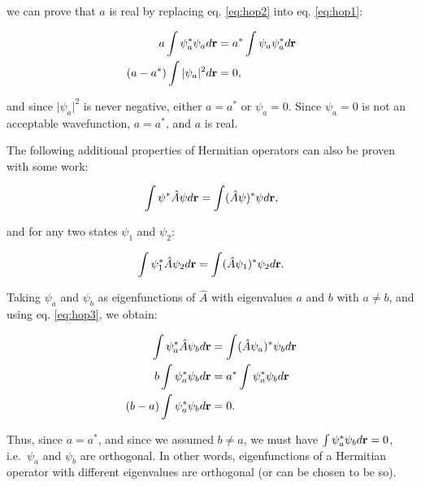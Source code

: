 \documentclass[
  9pt,
]{extbook}
\theoremstyle{definition}
\theoremstyle{definition}
\theoremstyle{definition}
\theoremstyle{remark}
\begin{document}
we can prove that \(a\) is real by replacing eq. \eqref{eq:hop2} into eq. \eqref{eq:hop1}:

\begin{equation}
\begin{aligned}
a \int \psi_a^{*} \psi_a d{\bf r}&= a^{*} \int \psi_a \psi_a^{*} d{\bf r}\\
(a - a^{*}) \int \vert\psi_a\vert^2 d{\bf r} &= 0,
\end{aligned}
\label{eq:hop4}
\end{equation}

and since \(\vert\psi_a\vert^2\) is never negative, either \(a = a^{*}\) or \(\psi_a = 0\). Since \(\psi_a = 0\) is not an acceptable wavefunction, \(a = a^{*}\), and \(a\) is real.

The following additional properties of Hermitian operators can also be proven with some work:

\begin{equation}
\int \psi^{*}\hat{A} \psi d{\bf r} = \int (\hat{A} \psi)^{*} \psi d{\bf r},
\label{eq:hop2b}
\end{equation}

and for any two states \(\psi_1\) and \(\psi_2\):

\begin{equation}
\int \psi_1^{*} \hat{A} \psi_2 d{\bf r}=
\int (\hat{A} \psi_1)^{*} \psi_2 d{\bf r}.
\label{eq:hop3}
\end{equation}

Taking \(\psi_a\) and \(\psi_b\) as eigenfunctions of \(\hat{A}\) with eigenvalues \(a\) and \(b\) with \(a \neq b\), and using eq. \eqref{eq:hop3}, we obtain:

\begin{equation}
\begin{aligned}
\int \psi_a^{*} \hat{A} \psi_b d{\bf r} &= \int (\hat{A} \psi_a)^{*} \psi_b d{\bf r}\\
b \int \psi_a^{*} \psi_b d{\bf r}   &= a^{*} \int \psi_a^{*} \psi_b d{\bf r}\\
(b - a) \int \psi_a^{*} \psi_b d{\bf r} &= 0.
\end{aligned}
\label{eq:hop5}
\end{equation}

Thus, since \(a = a^{*}\), and since we assumed \(b \neq a\), we must have \(\int \psi_a^{*} \psi_b d{\bf r} = 0\), i.e.~\(\psi_a\) and \(\psi_b\) are orthogonal. In other words, eigenfunctions of a Hermitian operator with different eigenvalues are orthogonal (or can be chosen to be so).
\end{document}
